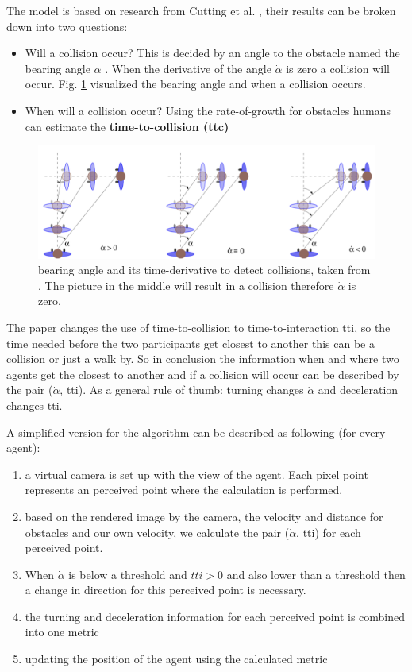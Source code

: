 \documentclass{acmsiggraph}               %
\begin{document}
The model is based on research from Cutting et al.  , their results can be broken down into two questions: 
\begin{itemize}
\item Will a collision occur? This is decided by an angle to the obstacle named the bearing angle $\alpha$ . When the derivative of the angle \textbf{$\dot{\alpha}$} is zero a collision will occur. Fig. \ref{fig:visualBearingangle} visualized the bearing angle and when a collision occurs.
\item When will a collision occur? Using the rate-of-growth for obstacles humans can estimate the \textbf{time-to-collision (ttc)}
\end{itemize}
\begin{figure}[h]
  \centering
  \includegraphics[width=1\linewidth]{images/visualApproach-bearingAngle.png}
  \caption{bearing angle and its time-derivative to detect collisions, taken from \protect\cite{ondrej_synthetic-vision_2010}. The picture in the middle will result in a collision therefore $\dot{\alpha}$ is zero.}
  \label{fig:visualBearingangle}
\end{figure}
The paper changes the use of time-to-collision to time-to-interaction tti, so the time needed before the two participants get closest to another this can be a collision or just a walk by. So in conclusion the information when and where two agents get the closest to another and if a collision will occur can be described by the pair ($\dot{\alpha}$, tti). As a general rule of thumb: turning changes $\dot{\alpha}$ and deceleration changes tti. 


 A simplified version for the algorithm can be described as following (for every agent):
\begin{enumerate}
    \item a virtual camera is set up with the view of the agent. Each pixel point represents an perceived point where the calculation is performed. 
    \item based on the rendered image by the camera, the velocity and distance for obstacles and our own velocity, we calculate the pair ($\dot{\alpha}$, tti) for each perceived point.
    \item When $\dot{\alpha}$ is below a threshold and $tti > 0$ and also lower than a threshold then a change in direction for this perceived point is necessary. 
    \item the turning and deceleration information for each perceived point is combined into one metric 
    \item updating the position of the agent using the calculated metric
\end{enumerate}
\end{document}
